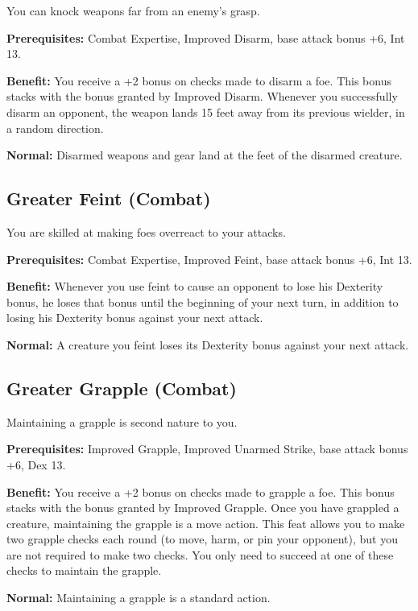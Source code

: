 				
You can knock weapons far from an enemy's grasp.
				
\textbf{Prerequisites:} Combat Expertise, Improved Disarm, base attack bonus +6, Int 13.
				
\textbf{Benefit:} You receive a +2 bonus on checks made to disarm a foe. This bonus stacks with the bonus granted by Improved Disarm. Whenever you successfully disarm an opponent, the weapon lands 15 feet away from its previous wielder, in a random direction.
				
\textbf{Normal:} Disarmed weapons and gear land at the feet of the disarmed creature.
				
\subsection{Greater Feint (Combat)}

				
You are skilled at making foes overreact to your attacks.
				
\textbf{Prerequisites:} Combat Expertise, Improved Feint, base attack bonus +6, Int 13.
				
\textbf{Benefit:} Whenever you use feint to cause an opponent to lose his Dexterity bonus, he loses that bonus until the beginning of your next turn, in addition to losing his Dexterity bonus against your next attack.
				
\textbf{Normal:} A creature you feint loses its Dexterity bonus against your next attack.
				
\subsection{Greater Grapple (Combat)}

				
Maintaining a grapple is second nature to you.
				
\textbf{Prerequisites:} Improved Grapple, Improved Unarmed Strike, base attack bonus +6, Dex 13.
				
\textbf{Benefit:} You receive a +2 bonus on checks made to grapple a foe. This bonus stacks with the bonus granted by Improved Grapple. Once you have grappled a creature, maintaining the grapple is a move action. This feat allows you to make two grapple checks each round (to move, harm, or pin your opponent), but you are not required to make two checks. You only need to succeed at one of these checks to maintain the grapple.
				
\textbf{Normal:} Maintaining a grapple is a standard action.
				
